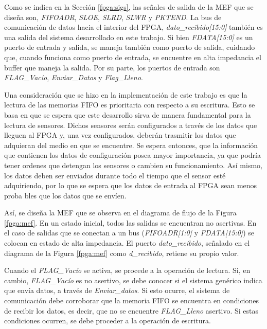 Como se indica en la Sección \ref{fpga:sigs}, las señales de salida de la MEF que se diseña son, {\it FIFOADR}, {\it SLOE}, {\it SLRD}, {\it SLWR} y {\it  PKTEND}. La bus de comunicación de datos hacia el interior del FPGA, {\it dato\_recibido[15:0]} también es una salida del sistema desarrollado en este trabajo. Si bien {\it FDATA[15:0]} es un puerto de entrada y salida, se maneja también como puerto de salida, cuidando que, cuando funciona como puerto de entrada, se encuentre en alta impedancia el buffer que maneja la salida. Por su parte, los puertos de entrada son {\it FLAG\_Vacío}, {\it Enviar\_Datos} y {\it Flag\_Lleno}.

Una consideración que se hizo en la implementación de este trabajo es que la lectura de las memorias FIFO es prioritaria con respecto a su escritura. Esto se basa en que se espera que este desarrollo sirva de manera fundamental para la lectura de sensores. Dichos sensores serán configurados a través de los datos que lleguen al FPGA y, una vez configurados, deberán trasmitir los datos que adquieran del medio en que se encuentre. Se espera entonces, que la información que contienen los datos de configuración posea mayor importancia, ya que podría tener ordenes que detengan los sensores o cambien su funcionamiento. Así mismo, los datos deben ser enviados durante todo el tiempo que el sensor esté adquiriendo, por lo que se espera que los datos de entrada al FPGA sean menos proba bles que los datos que se envíen.

Así, se diseña la MEF que se observa en el diagrama de flujo de la Figura \ref{fpga:mef}. En un estado inicial, todos las salidas se encuentran no asertivas. En el caso de salidas que se conectan a un bus ({\it FIFOADR[1:0]} y {\it FDATA[15:0]}) se colocan en estado de alta impedancia. El puerto {\it dato\_recibido}, señalado en el diagrama de la Figura \ref{fpga:mef} como {\it d\_recibido}, retiene su propio valor.

Cuando el {\it FLAG\_Vacío} se activa, se procede a la operación de lectura. Si, en cambio, {\it FLAG\_Vacío} es no asertivo, se debe conocer si el sistema genérico indica que envía datos, a través de {\it Enviar\_datos}. Si esto ocurre, el sistema de comunicación debe corroborar que la memoria FIFO se encuentra en condiciones de recibir los datos, es decir, que no se encuentre {\it FLAG\_Lleno} asertivo. Si estas condiciones ocurren, se debe proceder a la operación de escritura.

